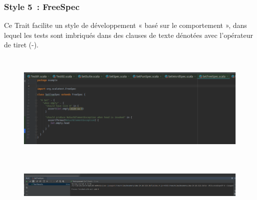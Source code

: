 \documentclass[12pt]{article}
\begin{document}

\par


\vspace{\baselineskip}
\subsubsection{Style 5 : FreeSpec}

\begin{justify}
Ce Trait facilite un style de développement « basé sur le comportement », dans lequel les tests sont imbriqués dans des clauses de texte dénotées avec l'opérateur de tiret (-).
\end{justify}\par




\begin{figure}[H]
	\begin{Center}
		\includegraphics[width=6.3in,height=2.14in]{./media/image34.png}
	\end{Center}
\end{figure}



\par




\begin{figure}[H]
	\begin{Center}
		\includegraphics[width=6.3in,height=0.67in]{./media/image35.png}
	\end{Center}
\end{figure}
\end{document}
